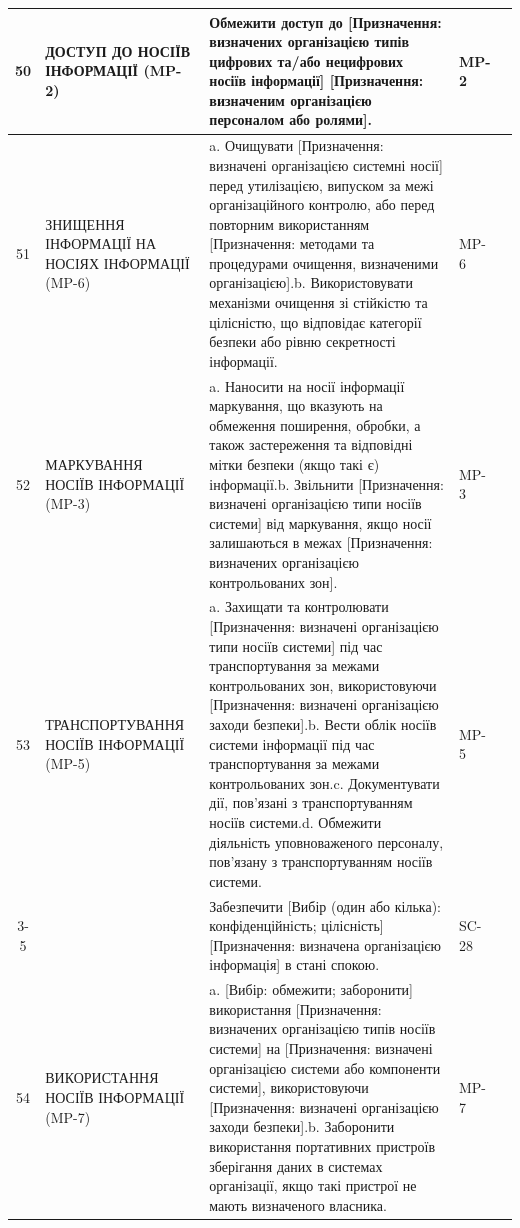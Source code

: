 \documentclass[10pt]{article}
\begin{document}
\begin{longtable}{|c|>{\raggedright\arraybackslash}p{4cm}|>{\raggedright\arraybackslash}p{6cm}|>{\raggedright\arraybackslash}p{1.5cm}|>{\raggedright\arraybackslash}p{3.5cm}|}
50 & ДОСТУП ДО НОСІЇВ ІНФОРМАЦІЇ (MP-2) & Обмежити доступ до [Призначення: визначених організацією типів цифрових та/або нецифрових носіїв інформації] [Призначення: визначеним організацією персоналом або ролями]. & MP-2 & \\ \hline
51 & ЗНИЩЕННЯ ІНФОРМАЦІЇ НА НОСІЯХ ІНФОРМАЦІЇ (MP-6) & a. Очищувати [Призначення: визначені організацією системні носії] перед утилізацією, випуском за межі організаційного контролю, або перед повторним використанням [Призначення: методами та процедурами очищення, визначеними організацією].\newline b. Використовувати механізми очищення зі стійкістю та цілісністю, що відповідає категорії безпеки або рівню секретності інформації. & MP-6 & \\ \hline
52 & МАРКУВАННЯ НОСІЇВ ІНФОРМАЦІЇ (MP-3) & a. Наносити на носії інформації маркування, що вказують на обмеження поширення, обробки, а також застереження та відповідні мітки безпеки (якщо такі є) інформації.\newline b. Звільнити [Призначення: визначені організацією типи носіїв системи] від маркування, якщо носії залишаються в межах [Призначення: визначених організацією контрольованих зон]. & MP-3 & \\ \hline
53 & ТРАНСПОРТУВАННЯ НОСІЇВ ІНФОРМАЦІЇ (MP-5) & a. Захищати та контролювати [Призначення: визначені організацією типи носіїв системи] під час транспортування за межами контрольованих зон, використовуючи [Призначення: визначені організацією заходи безпеки].\newline b. Вести облік носіїв системи інформації під час транспортування за межами контрольованих зон.\newline c. Документувати дії, пов'язані з транспортуванням носіїв системи.\newline d. Обмежити діяльність уповноваженого персоналу, пов'язану з транспортуванням носіїв системи. & MP-5 & \\ \cline{3-5}
 &  & Забезпечити [Вибір (один або кілька): конфіденційність; цілісність] [Призначення: визначена організацією інформація] в стані спокою. & SC-28 & \\ \hline
54 & ВИКОРИСТАННЯ НОСІЇВ ІНФОРМАЦІЇ (MP-7) & a. [Вибір: обмежити; заборонити] використання [Призначення: визначених організацією типів носіїв системи] на [Призначення: визначені організацією системи або компоненти системи], використовуючи [Призначення: визначені організацією заходи безпеки].\newline b. Заборонити використання портативних пристроїв зберігання даних в системах організації, якщо такі пристрої не мають визначеного власника. & MP-7 & \\ \hline

\end{longtable}
\end{document}
